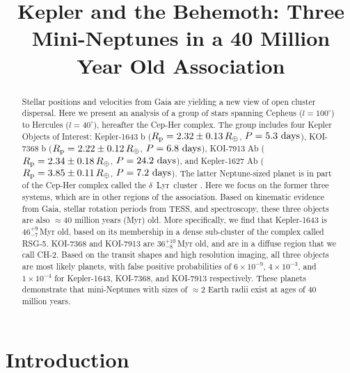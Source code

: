\documentclass[12pt,twocolumn,tighten,linenumbers,trackchanges]{aastex63}
\begin{document}
\title{
  Kepler and the Behemoth: Three Mini-Neptunes in a 40 Million Year Old Association
}



\begin{abstract}
  Stellar positions and velocities from Gaia are yielding a new view
  of open cluster dispersal.  
  Here we present an analysis of a group
  of stars spanning Cepheus ($l=100^\circ$) to Hercules ($l=40^\circ$),
  hereafter the Cep-Her complex.  The group includes four Kepler
  Objects of Interest:
  Kepler-1643 b ($R_{\rm p} = 2.32 \pm 0.13\,R_\oplus$, $P = 5.3\ {\rm days}$),
  KOI-7368 b ($R_{\rm p} = 2.22 \pm 0.12\,R_\oplus$, $P = 6.8\ {\rm days}$), 
  KOI-7913 Ab ($R_{\rm p} = 2.34 \pm 0.18\,R_\oplus$, $P = 24.2\ {\rm days}$), and
  Kepler-1627 Ab ($R_{\rm p} = 3.85 \pm 0.11\,R_\oplus$, $P = 7.2\ {\rm days}$).
  The latter Neptune-sized planet is in part of the Cep-Her complex
  called the $\delta$\ Lyr\ cluster \citep{bouma_kep1627_2022}.  Here
  we focus on the former three systems, which are in other regions of
  the association.  Based on kinematic evidence from Gaia, stellar
  rotation periods from TESS, and spectroscopy, these three objects
  are also $\approx$40 million years (Myr) old.  More specifically, we
  find that Kepler-1643 is $46^{+9}_{-7}$\,Myr old, based on its
  membership in a dense sub-cluster of the complex called RSG-5.
  KOI-7368 and KOI-7913 are $36^{+10}_{-8}$\,Myr old, and are in a
  diffuse region that we call CH-2.  Based on the transit shapes and
  high resolution imaging, all three objects are most likely planets,
  with false positive probabilities of $6\times10^{-9}$,
  $4\times10^{-3}$, and $1\times10^{-4}$ for Kepler-1643, KOI-7368,
  and KOI-7913 respectively.  These planets demonstrate
  that mini-Neptunes with sizes of $\approx$2 Earth radii exist at ages
  of 40 million years.
\end{abstract}



\section{Introduction}
\end{document}
